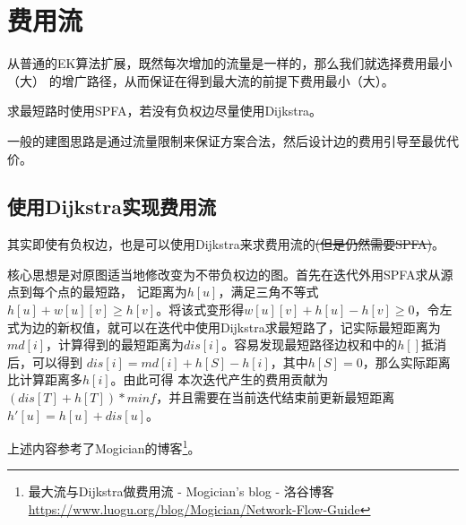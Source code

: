 \section{费用流}
从普通的EK算法扩展，既然每次增加的流量是一样的，那么我们就选择费用最小（大）
的增广路径，从而保证在得到最大流的前提下费用最小（大）。

求最短路时使用SPFA，若没有负权边尽量使用Dijkstra。

一般的建图思路是通过流量限制来保证方案合法，然后设计边的费用引导至最优代价。

\subsection{使用Dijkstra实现费用流}\label{DijMCMF}
其实即使有负权边，也是可以使用Dijkstra来求费用流的\sout{(但是仍然需要SPFA)}。

核心思想是对原图适当地修改变为不带负权边的图。首先在迭代外用SPFA求从源点到每个点的最短路，
记距离为$h[u]$，满足三角不等式$h[u]+w[u][v]\geq h[v]$。将该式变形得$w[u][v]+h[u]-h[v]
\geq 0$，令左式为边的新权值，就可以在迭代中使用Dijkstra求最短路了，记实际最短距离为
$md[i]$，计算得到的最短距离为$dis[i]$。容易发现最短路径边权和中的$h[]$抵消后，可以得到
$dis[i]=md[i]+h[S]-h[i]$，其中$h[S]=0$，那么实际距离比计算距离多$h[i]$。由此可得
本次迭代产生的费用贡献为$(dis[T]+h[T])*minf$，并且需要在当前迭代结束前更新最短距离
$h'[u]=h[u]+dis[u]$。

上述内容参考了Mogician的博客\footnote{
    最大流与Dijkstra做费用流 - Mogician's blog - 洛谷博客
    \url{https://www.luogu.org/blog/Mogician/Network-Flow-Guide}}。

